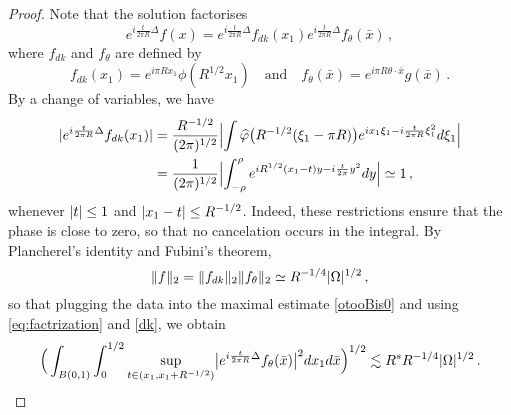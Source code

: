 \documentclass[biblatex]{pzorin-note}
\begin{document}
\begin{proof}
Note that the solution factorises
\begin{equation}\label{eq:factrization}
e^{i\frac{t}{2\pi R}\Delta} f(x) =e^{i\frac{t}{2\pi R}\Delta} f_{dk}(x_1) e^{i\frac{t}{2\pi R}\Delta} f_{\theta}(\bar{x}) \, ,
\end{equation}
where $f_{dk}$ and $f_\theta$ are defined by
\[
f_{dk}(x_1)=e^{i\pi Rx_1}\phi(R^{1/2}x_1)\quad\text{and}\quad f_\theta(\bar{x}) = e^{i\pi R\theta\cdot \bar{x}} g(\bar{x}) \, .
\]
By a change of variables, we have
\begin{align}\label{dk}
\abs{e^{i\frac{t}{2\pi R}\Delta} f_{dk}(x_1)}&=\frac{R^{-1/2}}{(2\pi)^{1/2}}\abs[\Big]{\int \widehat{\phi}\big(R^{-1/2}(\xi_1-\pi R)\big)e^{ ix_1\xi_1 -i\frac{t}{2\pi R} \xi_1^{2}} d \xi_1}\\\nonumber
&=\frac{1}{(2\pi)^{1/2}}\abs[\Big]{\int_{-\rho}^\rho e^{ iR^{1/2}(x_1-t)y-i\frac{t}{2\pi} y^{2}} d y}\simeq 1 \, ,
\end{align}
whenever $\abs{t}\le 1$ and $\abs{x_1-t}\le R^{-1/2}$. %
Indeed, these restrictions ensure that the phase is close to zero, so that no cancelation occurs in the integral.
By Plancherel's identity and Fubini's theorem,
\begin{equation}\nonumber
\norm{f}_2=\norm{f_{dk}}_2\norm{f_\theta}_2\simeq R^{-1/4}\abs{\Omega}^{1/2}\, ,
\end{equation}
so that plugging the data into the maximal estimate \eqref{otooBis0} and using \eqref{eq:factrization} and \eqref{dk},
we obtain
\begin{equation}\label{otooBis}
\Big(\int_{B(0,1)} \int_0^{1/2} \sup_{t\in(x_1,x_1+R^{-1/2})} \abs[\big]{ e^{i\frac{t}{2\pi R}\Delta} f_\theta(\bar{x}) }^2dx_1d\bar{x}\Big)^{1/2} \lesssim R^sR^{-1/4}\abs{\Omega}^{1/2} \, .
\end{equation}


\end{proof}
\end{document}
